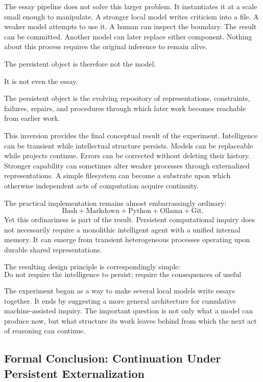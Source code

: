 \documentclass[11pt]{article}
\begin{document}
The essay pipeline does not solve this larger problem. It instantiates it at a scale small enough to manipulate. A stronger local model writes criticism into a file. A weaker model attempts to use it. A human can inspect the boundary. The result can be committed. Another model can later replace either component. Nothing about this process requires the original inference to remain alive.

The persistent object is therefore not the model.

It is not even the essay.

The persistent object is the evolving repository of representations, constraints, failures, repairs, and procedures through which later work becomes reachable from earlier work.

This inversion provides the final conceptual result of the experiment. Intelligence can be transient while intellectual structure persists. Models can be replaceable while projects continue. Errors can be corrected without deleting their history. Stronger capability can sometimes alter weaker processes through externalized representations. A simple filesystem can become a substrate upon which otherwise independent acts of computation acquire continuity.

The practical implementation remains almost embarrassingly ordinary:
\[
    \text{Bash}
    +
    \text{Markdown}
    +
    \text{Python}
    +
    \text{Ollama}
    +
    \text{Git}.
\]
Yet this ordinariness is part of the result. Persistent computational inquiry does not necessarily require a monolithic intelligent agent with a unified internal memory. It can emerge from transient heterogeneous processes operating upon durable shared representations.

The resulting design principle is correspondingly simple:
\[
    \boxed{
    \text{Do not require the intelligence to persist;
    require the consequences of useful intelligence to remain available
    for inspection, criticism, repair, and continuation.}
    }
\]

The experiment began as a way to make several local models write essays together. It ends by suggesting a more general architecture for cumulative machine-assisted inquiry. The important question is not only what a model can produce now, but what structure its work leaves behind from which the next act of reasoning can continue.

\subsection{Formal Conclusion: Continuation Under Persistent Externalization}
\end{document}
